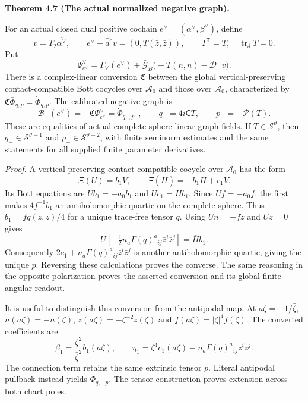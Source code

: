 \documentclass[
  english,
  11pt,
  reqno]{amsart}
\makeatletter
\newcommand{\pandocstatementheading}[1]{%
  \par\if@nobreak\else
    \addpenalty{\@beginparpenalty}%
    \addvspace{.5\baselineskip plus .2\baselineskip minus .2\baselineskip}%
  \fi
  {\normalfont\bfseries #1\par}%
  \nobreak\@afterindenttrue\@afterheading
}
\makeatother
\begin{document}
\pandocstatementheading{\leavevmode{}\label{thm:online-actual-linear-contact-graph}Theorem 4.7 (The actual normalized negative graph).}

For an actual closed dual positive cochain
\(e^\vee=(\alpha^\vee,\beta^\vee)\), define \[
v=\overline{T_2\overline{\alpha^\vee}},\qquad
e^\vee-\bar d^0v=(0,T(\bar z,\bar z)),\qquad
T^{\mathsf T}=T,\quad\operatorname{tr}_\delta T=0.
\] Put%
 \[
\Psi^\vee_{e^\vee}
=\Gamma_\vee(e^\vee)
 +\bar{\mathcal G}_B\bigl(-T(n,n)-\mathcal D_-v\bigr).
\] There is a complex-linear conversion \(\mathfrak C\) between the
global vertical-preserving contact-compatible Bott cocycles over
\(\overline{\mathcal A}_0\) and those over \(\mathcal A_0\),
characterized by \(\mathfrak C\dot{\bar\Phi}_{q,p}=\dot\Phi_{q,p}\). The
calibrated negative graph is%
 \[
\mathcal B_-(e^\vee)
=-\mathfrak C\Psi^\vee_{e^\vee}
=\dot\Phi_{q_-,p_-},\qquad
q_-=4i\mathsf CT,\qquad p_-=-\mathcal P(T).
\] These are equalities of actual complete-sphere linear graph fields.
If \(T\in\mathscr S^\vartheta\), then \(q_-\in\mathscr S^{\vartheta-1}\)
and \(p_-\in\mathscr S^{\vartheta-2}\), with finite seminorm estimates
and the same statements for all supplied finite parameter derivatives.

\emph{Proof.} A vertical-preserving contact-compatible cocycle over
\(\overline{\mathcal A}_0\) has the form \[
\Xi(U)=b_1V,\qquad \Xi(\bar H)=-b_1H+c_1V.
\] Its Bott equations are \(Ub_1=-a_0b_1\) and \(Uc_1=\bar H b_1\).
Since \(Uf=-a_0f\), the first makes \(4f^{-1}b_1\) an antiholomorphic
quartic on the complete sphere. Thus \(b_1=fq(\bar z,\bar z)/4\) for a
unique trace-free tensor \(q\). Using \(Un=-f\bar z\) and \(U\bar z=0\)
gives \[
U\left[-\tfrac12n_a\Gamma(q)^a{}_{ij}\bar z^i\bar z^j\right]
=\bar H b_1.
\] Consequently \(2c_1+n_a\Gamma(q)^a{}_{ij}\bar z^i\bar z^j\) is
another antiholomorphic quartic, giving the unique \(p\). Reversing
these calculations proves the converse. The same reasoning in the
opposite polarization proves the asserted conversion and its global
finite angular readout.

It is useful to distinguish this conversion from the antipodal map. At
\(a\zeta=-1/\bar\zeta\), \(n(a\zeta)=-n(\zeta)\),
\(\bar z(a\zeta)=-\zeta^{-2}z(\zeta)\) and
\(f(a\zeta)=|\zeta|^4f(\zeta)\). The converted coefficients are%
 \[
\beta_1=\frac{\zeta^2}{\bar\zeta^2}b_1(a\zeta),\qquad
\eta_1=\zeta^4c_1(a\zeta)
       -n_a\Gamma(q)^a{}_{ij}z^iz^j.
\] The connection term retains the same extrinsic tensor \(p\). Literal
antipodal pullback instead yields \(\dot\Phi_{q,-p}\). The tensor
construction proves extension across both chart poles.
\end{document}
